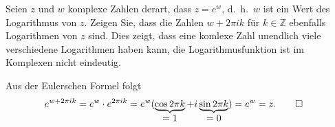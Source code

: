 Seien $z$ und $w$  komplexe Zahlen derart, dass $z=e^w$, d.~h.~$w$ ist
ein Wert des Logarithmus von $z$.
Zeigen Sie, dass die Zahlen $w+2\pi ik$ für $k\in\mathbb Z$ ebenfalls 
Logarithmen von $z$ sind.
Dies zeigt, dass eine komlexe Zahl unendlich viele verschiedene
Logarithmen haben kann, die Logarithmusfunktion ist im Komplexen
nicht eindeutig.

\begin{loesung}
Aus der Eulerschen Formel folgt
\begin{align*}
e^{w+2\pi ik}
&=
e^w\cdot e^{2\pi ik}
=
e^w (\underbrace{\cos 2\pi k}_{\displaystyle=1} + i \underbrace{\sin 2\pi k}_{\displaystyle = 0})
=
e^w
=
z.
\qedhere
\end{align*}
\end{loesung}
